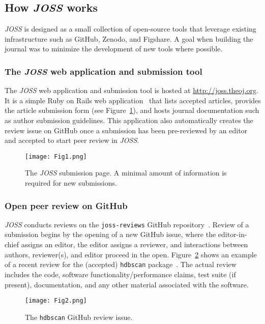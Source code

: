 \documentclass{article}
\newcommand\joss{\textit{JOSS}}
\begin{document}
\subsection{How \joss{} works}\label{howitworks}

\joss{} is designed as a small collection of open-source tools that leverage existing infrastructure such as GitHub, Zenodo, and Figshare. A goal when building the journal was to minimize the development of new tools where possible.

\subsubsection*{The \joss{} web application and submission tool}

The \joss{} web application and submission tool is hosted at \href{http://joss.theoj.org}{http://joss.theoj.org}. It is a simple Ruby on Rails web application~\cite{joss-site} that lists accepted articles, provides the article submission form (see Figure~\ref{fig:submission}), and hosts journal documentation such as author submission guidelines.
This application also automatically creates the review issue on GitHub once a submission has been pre-reviewed by an editor and accepted to start peer review in \joss{}.


\begin{figure}[t]
\centering
\texttt{[image: Fig1.png]}
\caption{The \joss{} submission page. A minimal amount of information is required for new submissions.
\label{fig:submission}}
\end{figure}

\subsubsection*{Open peer review on GitHub}

\joss{} conducts reviews on the \texttt{joss-reviews} GitHub repository~\cite{joss-reviews}.  Review of a submission begins by the opening of a new GitHub issue, where the editor-in-chief assigns an editor, the editor assigns a reviewer, and interactions between authors, reviewer(s), and editor proceed in the open. Figure~\ref{fig:review} shows an example of a recent review for the (accepted) \texttt{hdbscan} package~\cite{McInnes2017}.
The actual review includes the code, software functionality\slash performance claims, test suite (if present), documentation, and any other material associated with the software.


\begin{figure}[t]
\centering
\texttt{[image: Fig2.png]}
\caption{The \texttt{hdbscan} GitHub review issue.
\label{fig:review}}
\end{figure}
\end{document}
